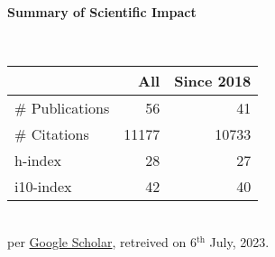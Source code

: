 \headedsection %
{\bf Summary of Scientific Impact}{}{}
{
    \qquad~~~~
    \begin{minipage}[t]{0.6\textwidth}
        \begin{tabular}{lrr}
        \hline
         & All & Since 2018\\
        \hline
        \# Publications & 56     & 41    \\
        \# Citations    & 11177  & 10733  \\
        h-index         & 28     & 27    \\
        i10-index       & 42     & 40    \\
        \hline
    \end{tabular}
    \\
    {\footnotesize{
        per \href{https://scholar.google.com/citations?user=wpLQuroAAAAJ}{Google Scholar},
        retreived on 6$^\text{th}$ July, 2023.
        }
    }
    \end{minipage}

}
